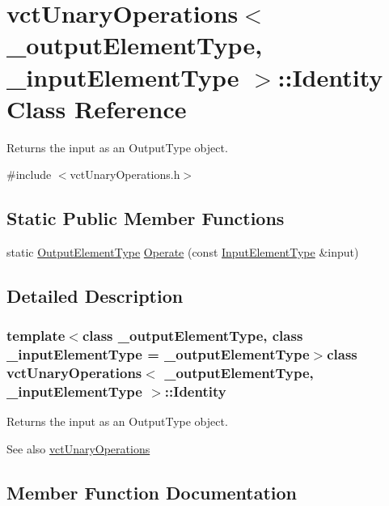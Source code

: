 \hypertarget{classvct_unary_operations_1_1_identity}{}\section{vct\+Unary\+Operations$<$ \+\_\+output\+Element\+Type, \+\_\+input\+Element\+Type $>$\+:\+:Identity Class Reference}
\label{classvct_unary_operations_1_1_identity}


Returns the input as an Output\+Type object.  




{\ttfamily \#include $<$vct\+Unary\+Operations.\+h$>$}

\subsection*{Static Public Member Functions}
\begin{DoxyCompactItemize}
\item 
static \hyperlink{classvct_unary_operations_a42306ac3dd20d32c6d6c66ac3fa2e7b9}{Output\+Element\+Type} \hyperlink{classvct_unary_operations_1_1_identity_ac4ee894a3313fdc802c84c95f454bcdc}{Operate} (const \hyperlink{classvct_unary_operations_abf3b77bb7b8abd7ba72a6a45a65696a7}{Input\+Element\+Type} \&input)
\end{DoxyCompactItemize}


\subsection{Detailed Description}
\subsubsection*{template$<$class \+\_\+output\+Element\+Type, class \+\_\+input\+Element\+Type = \+\_\+output\+Element\+Type$>$class vct\+Unary\+Operations$<$ \+\_\+output\+Element\+Type, \+\_\+input\+Element\+Type $>$\+::\+Identity}

Returns the input as an Output\+Type object. 

\begin{DoxySeeAlso}{See also}
\hyperlink{classvct_unary_operations}{vct\+Unary\+Operations} 
\end{DoxySeeAlso}


\subsection{Member Function Documentation}
\hypertarget{classvct_unary_operations_1_1_identity_ac4ee894a3313fdc802c84c95f454bcdc}{}

